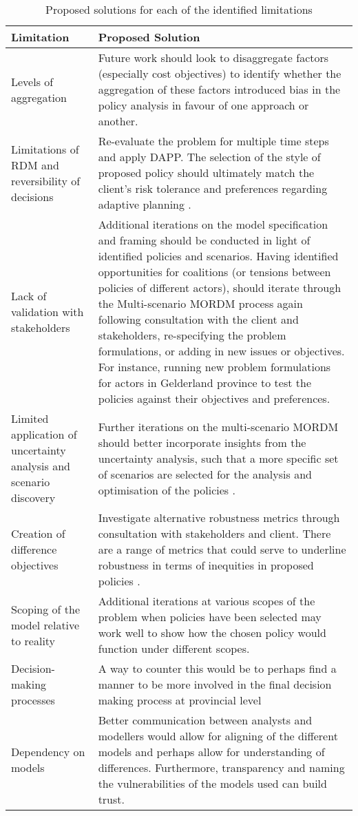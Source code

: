 \begin{table}[h]
\caption{Proposed solutions for each of the identified limitations}
\label{tab:Proposed Solutions}
\centering
\begin{tabular}{p{}|p{}}
\textbf{Limitation} & \textbf{Proposed Solution}  \\ \hline
Levels of aggregation & Future work should look to disaggregate factors (especially cost objectives) to identify whether the aggregation of these factors introduced bias in the policy analysis in favour of one approach or another. \\ \hline
Limitations of RDM and reversibility of decisions & Re-evaluate the problem for multiple time steps and apply DAPP. The selection of the style of proposed policy should ultimately match the client's risk tolerance and preferences regarding adaptive planning \parencite{marchau_decision_2019}. \\ \hline
Lack of validation with stakeholders &Additional iterations on the model specification and framing should be conducted in light of identified policies and scenarios. Having identified opportunities for coalitions (or tensions between policies of different actors), should iterate through the Multi-scenario MORDM process again following consultation with the client and stakeholders, re-specifying the problem formulations, or adding in new issues or objectives. For instance, running new problem formulations for actors in Gelderland province to test the policies against their objectives and preferences. \\ \hline
Limited application of uncertainty analysis and scenario discovery & Further iterations on the multi-scenario MORDM should better incorporate insights from the uncertainty analysis, such that a more specific set of scenarios are selected for the analysis and optimisation of the policies \parencite{watson_incorporating_2017, eker_including_2018}. \\ \hline
Creation of difference objectives & Investigate alternative robustness metrics through consultation with stakeholders and client. There are a range of metrics that could serve to underline robustness in terms of inequities in proposed policies \parencite{mcphail_robustness_2018}. \\ \hline
Scoping of the model relative to reality & Additional iterations at various scopes of the problem when policies have been selected may work well to show how the chosen policy would function under different scopes.        \\ \hline
Decision-making processes & A way to counter this would be to perhaps find a manner to be more involved in the final decision making process at provincial level   \\ \hline
Dependency on models &  Better communication between analysts and modellers would allow for aligning of the different models and perhaps allow for understanding of differences. Furthermore, transparency and naming the vulnerabilities of the models used can build trust. \parencite{saltelli_five_2020}               
\end{tabular}
\end{table}

